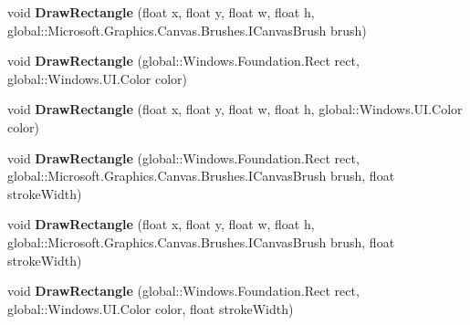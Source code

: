 \begin{DoxyCompactItemize}
\item 
\mbox{\label{interface_microsoft_1_1_graphics_1_1_canvas_1_1_i_canvas_drawing_session_ace14f3c382c98a9f991a0ebc89322afd}} 
void {\bfseries Draw\+Rectangle} (float x, float y, float w, float h, global\+::\+Microsoft.\+Graphics.\+Canvas.\+Brushes.\+I\+Canvas\+Brush brush)
\item 
\mbox{\label{interface_microsoft_1_1_graphics_1_1_canvas_1_1_i_canvas_drawing_session_aed385f9f2e3d138d11ee96a1b41e92cf}} 
void {\bfseries Draw\+Rectangle} (global\+::\+Windows.\+Foundation.\+Rect rect, global\+::\+Windows.\+U\+I.\+Color color)
\item 
\mbox{\label{interface_microsoft_1_1_graphics_1_1_canvas_1_1_i_canvas_drawing_session_a006dca4057187b46ebc6cb7270696a92}} 
void {\bfseries Draw\+Rectangle} (float x, float y, float w, float h, global\+::\+Windows.\+U\+I.\+Color color)
\item 
\mbox{\label{interface_microsoft_1_1_graphics_1_1_canvas_1_1_i_canvas_drawing_session_a7244fdf7597b47d3d572630ac2278744}} 
void {\bfseries Draw\+Rectangle} (global\+::\+Windows.\+Foundation.\+Rect rect, global\+::\+Microsoft.\+Graphics.\+Canvas.\+Brushes.\+I\+Canvas\+Brush brush, float stroke\+Width)
\item 
\mbox{\label{interface_microsoft_1_1_graphics_1_1_canvas_1_1_i_canvas_drawing_session_a21da7f5afc57a55caeb353c50f1e79c8}} 
void {\bfseries Draw\+Rectangle} (float x, float y, float w, float h, global\+::\+Microsoft.\+Graphics.\+Canvas.\+Brushes.\+I\+Canvas\+Brush brush, float stroke\+Width)
\item 
\mbox{\label{interface_microsoft_1_1_graphics_1_1_canvas_1_1_i_canvas_drawing_session_a2a30c4db1b017bd35354d76a06fffd0d}} 
void {\bfseries Draw\+Rectangle} (global\+::\+Windows.\+Foundation.\+Rect rect, global\+::\+Windows.\+U\+I.\+Color color, float stroke\+Width)

\end{DoxyCompactItemize}

